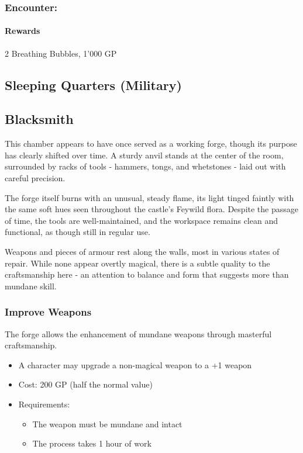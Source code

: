 \subsubsection*{Encounter: }
{\entryfont \hyperref[monster:HoardMimic]{} \hyperref[monster:LargeMimic]{}
\paragraph*{Rewards} 2 Breathing Bubbles, 1'000 GP}
\subsection*{ Sleeping Quarters (Military)}
\subsection*{ Blacksmith}
{\entryfont This chamber appears to have once served as a working forge, though its purpose has clearly shifted over time. A sturdy anvil stands at the center of the room, surrounded by racks of tools - hammers, tongs, and whetstones - laid out with careful precision.

The forge itself burns with an unusual, steady flame, its light tinged faintly with the same soft hues seen throughout the castle's Feywild flora. Despite the passage of time, the tools are well-maintained, and the workspace remains clean and functional, as though still in regular use.

Weapons and pieces of armour rest along the walls, most in various states of repair. While none appear overtly magical, there is a subtle quality to the craftsmanship here - an attention to balance and form that suggests more than mundane skill.}
\subsubsection*{Improve Weapons}
{\entryfont The forge allows the enhancement of mundane weapons through masterful craftsmanship.
\begin{itemize}
	\item A character may upgrade a non-magical weapon to a +1 weapon
	\item Cost: 200 GP (half the normal value)
	\item Requirements:
	\begin{itemize}
		\item The weapon must be mundane and intact
		\item The process takes 1 hour of work
	\end{itemize}
\end{itemize}}
